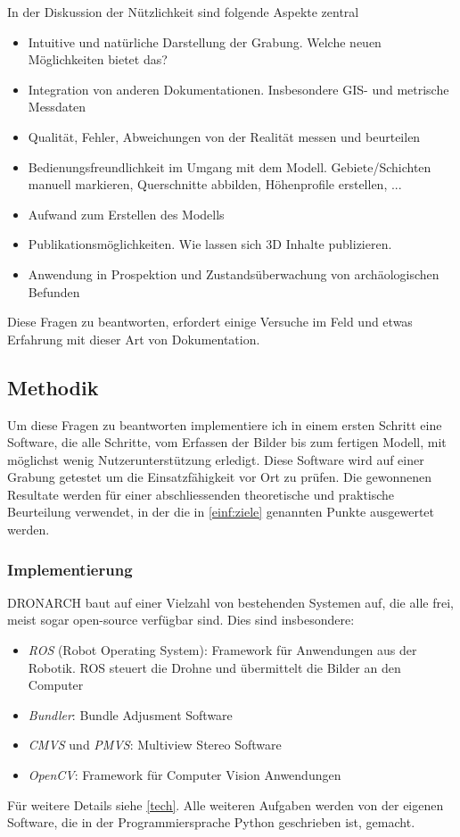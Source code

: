 \documentclass{paper}
\begin{document}
				In der Diskussion der Nützlichkeit sind folgende Aspekte zentral
				\begin{itemize}
					\item
						Intuitive und natürliche Darstellung der Grabung. Welche neuen Möglichkeiten bietet das?
					\item
						Integration von anderen Dokumentationen. Insbesondere GIS- und metrische Messdaten
					\item
						Qualität, Fehler, Abweichungen von der Realität messen und beurteilen
					\item
						Bedienungsfreundlichkeit im Umgang mit dem Modell. Gebiete/Schichten manuell markieren, Querschnitte abbilden, Höhenprofile erstellen, ...
					\item
						Aufwand zum Erstellen des Modells
					\item
						Publikationsmöglichkeiten. Wie lassen sich 3D Inhalte publizieren.
					\item
						Anwendung in Prospektion und Zustandsüberwachung von archäologischen Befunden
				\end{itemize}
				
				Diese Fragen zu beantworten, erfordert einige Versuche im Feld und etwas Erfahrung mit dieser Art von Dokumentation.
				
		\subsection{Methodik}
			Um diese Fragen zu beantworten implementiere ich in einem ersten Schritt eine Software, die alle Schritte, vom Erfassen der Bilder bis zum fertigen Modell, mit möglichst wenig Nutzerunterstützung erledigt.			
			Diese Software wird auf einer Grabung getestet um die Einsatzfähigkeit vor Ort zu prüfen.
			Die gewonnenen Resultate werden für einer abschliessenden theoretische und praktische Beurteilung verwendet, in der die in \autoref{einf:ziele} genannten Punkte ausgewertet werden. 
			
			\subsubsection{Implementierung}
				DRONARCH baut auf einer Vielzahl von bestehenden Systemen auf, die alle frei, meist sogar open-source verfügbar sind.
				Dies sind insbesondere:
				\begin{itemize}
					\item
					 	\emph{ROS} (Robot Operating System): Framework für Anwendungen aus der Robotik. ROS steuert die Drohne und übermittelt die Bilder an den Computer
					\item
						\emph{Bundler}: Bundle Adjusment Software
					\item
						\emph{CMVS} und \emph{PMVS}: Multiview Stereo Software
					\item
						\emph{OpenCV}: Framework für Computer Vision Anwendungen
				\end{itemize}
				Für weitere Details siehe \autoref{tech}.
				Alle weiteren Aufgaben werden von der eigenen Software, die in der Programmiersprache Python geschrieben ist, gemacht.
			
\end{document}
